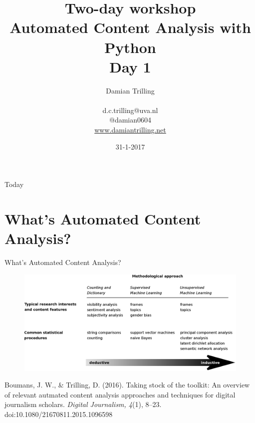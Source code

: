\documentclass{beamer}
\begin{document}
\title[Automated Content Analysis with Python]{\textbf{Two-day workshop\\ Automated Content Analysis with Python} \\ Day 1}
\author[Damian Trilling]{Damian Trilling \\ ~ \\ \footnotesize{d.c.trilling@uva.nl \\@damian0604} \\ \url{www.damiantrilling.net}}
\date{31-1-2017}



\begin{frame}{}
\titlepage
\end{frame}

\begin{frame}{Today}
\tableofcontents
\end{frame}



\section[What's ACA?]{What's Automated Content Analysis?}
\begin{frame}[plain]
	What's Automated Content Analysis?
\end{frame}


\begin{frame}[plain]
\begin{figure}
\centering
\includegraphics[width=1.0\linewidth]{boumanstrilling2016}
\label{fig:boumanstrilling2016}
\end{figure}
\tiny{Boumans, J. W., \& Trilling, D. (2016). Taking stock of the toolkit: An overview of relevant autmated content analysis approaches and techniques for digital journalism scholars. \emph{Digital Journalism, 4}(1), 8–23. doi:10.1080/21670811.2015.1096598}
\end{frame}
\end{document}

